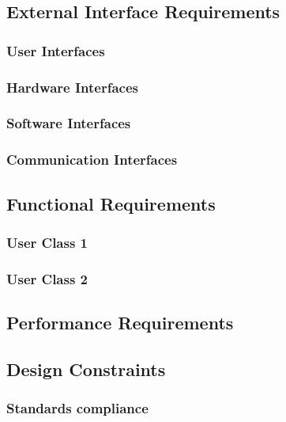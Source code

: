 \documentclass[a4paper,11pt]{report} %
\begin{document}
	\subsection{External Interface Requirements}
	
	\subsubsection{User Interfaces}
	
	\subsubsection{Hardware Interfaces}
	
	\subsubsection{Software Interfaces}
	
	\subsubsection{Communication Interfaces}
	
	\subsection{Functional Requirements}
	
	\subsubsection{User Class 1}
	
	\subsubsection{User Class 2}
	
	\subsection{Performance Requirements}
	
	\subsection{Design Constraints}
	
	\subsubsection{Standards compliance}
	
\end{document}
